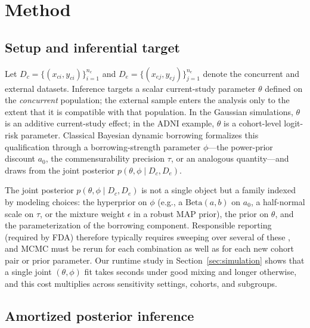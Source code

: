 \section{Method}
\label{sec:problem}

\subsection{Setup and inferential target}

Let $D_c = \{(x_{ci}, y_{ci})\}_{i=1}^{n_c}$ and
$D_e = \{(x_{ej}, y_{ej})\}_{j=1}^{n_e}$ denote the concurrent and
external datasets. Inference targets a scalar current-study parameter
$\theta$ defined on the \emph{concurrent} population; the external sample
enters the analysis only to the extent that it is compatible with that
population. In the Gaussian simulations, $\theta$ is an additive
current-study effect; in the ADNI example, $\theta$ is a cohort-level
logit-risk parameter.
Classical Bayesian dynamic borrowing formalizes this qualification through
a borrowing-strength parameter $\phi$---the power-prior discount $a_0$,
the commensurability precision $\tau$, or an analogous quantity---and draws
from the joint posterior $p(\theta, \phi \mid D_c, D_e)$.

The joint posterior $p(\theta, \phi \mid D_c, D_e)$ is not a single
object but a family indexed by modeling choices: the hyperprior on
$\phi$ (e.g., a $\mathrm{Beta}(a,b)$ on $a_0$, a half-normal scale on
$\tau$, or the mixture weight $\epsilon$ in a robust MAP prior), the
prior on $\theta$, and the parameterization of the borrowing component.
Responsible reporting (required by FDA) therefore typically requires sweeping over
several of these
\citep{schmidli2014robust,gravestock2017adaptive,vanrosmalen2018including},
and MCMC must be rerun for each combination as well as for each new
cohort pair or prior parameter.
Our runtime study in Section~\ref{sec:simulation} shows that a single
joint $(\theta, \phi)$ fit takes seconds under good mixing and longer
otherwise, and this cost multiplies across sensitivity settings,
cohorts, and subgroups.

\subsection{Amortized posterior inference}

